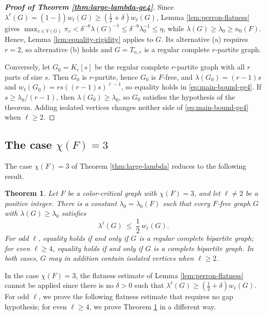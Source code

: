 \documentclass[11pt, a4paper]{article}
\newtheorem{theorem}{Theorem}[section]
\theoremstyle{definition}
\theoremstyle{plain}
\renewcommand{\le}{\leqslant}
\renewcommand{\ge}{\geqslant}
\begin{document}
\begin{proof}[{\bf Proof of Theorem
\ref{thm:large-lambda-ge4}}]
Since $\lambda^\ell (G)=(1-\frac1r)w_\ell (G)\ge
(\frac12+\delta )w_\ell (G)$, 
Lemma \ref{lem:perron-flatness} gives
$\max_{v\in V(G)}\pi_v<\delta^{-8}\lambda (G)^{-1}
\le \delta^{-8}\lambda_0^{-1}\le \eta$, while
$\lambda (G)\ge \lambda_0\ge n_0(F)$.
Hence, Lemma \ref{lem:equality-rigidity} applies to $G$.
Its alternative (a) requires $r=2$, so alternative (b)
holds and $G=T_{n,r}$ is a regular complete $r$-partite
graph.

Conversely, let $G_0=K_r[s]$ be the regular complete $r$-partite
graph with all $r$ parts of size $s$. Then $G_0$ is
$r$-partite, hence $G_0$ is $F$-free, and $\lambda (G_0)=(r-1)s$
and $w_\ell (G_0)=rs((r-1)s)^{\ell -1}$, so equality holds
in \eqref{eq:main-bound-ge4}. If
$s\ge \lambda_0/(r-1)$, then
$\lambda (G_0)\ge \lambda_0$, so $G_0$ satisfies the
hypothesis of the theorem. Adding isolated vertices
changes neither side of \eqref{eq:main-bound-ge4} when
$\ell \ge 2$.
\end{proof}




\subsection{The case $\chi (F)=3$}

The case $\chi (F)=3$ of Theorem \ref{thm:large-lambda}
reduces to the following result. 

\begin{theorem}
\label{thm:large-lambda-chi=3}
Let $F$ be a color-critical graph with $\chi (F)=3$, and
let $\ell \neq 2$ be a positive integer. There
is a constant $\lambda_0=\lambda_0(F)$ such that every
$F$-free graph $G$ with $\lambda (G)\ge \lambda_0$
satisfies
\begin{equation}\label{eq:main-bound-chi=3}
  \lambda^{\ell}(G)\ \le\ \frac12\,w_\ell (G).
\end{equation}
For odd $\ell$, equality holds if and only if $G$ is a
regular complete bipartite graph; for even
$\ell \ge 4$, equality holds if and only if $G$ is a
complete bipartite graph. In both cases, $G$ may in
addition contain isolated vertices when $\ell \ge 2$.
\end{theorem}

In the case $\chi (F)=3$, the flatness estimate of Lemma \ref{lem:perron-flatness} cannot be applied since there is no $\delta >0$ such that $\lambda^{\ell} (G) \ge (\frac{1}{2} + \delta)w_{\ell}(G)$. 
For odd $\ell$, we prove the following flatness estimate  
that requires no gap hypothesis; for even $\ell \ge 4$, we prove Theorem \ref{thm:large-lambda-chi=3} in a different way. 
\end{document}
